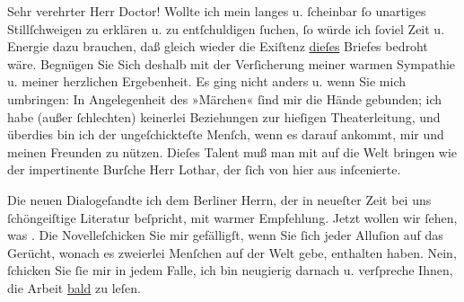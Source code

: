 \pstart{}Sehr verehrter Herr Doctor!\pend\vspace{0.5em}
\pstart
           Wollte ich mein langes u. ſcheinbar ſo unartiges Stillſchweigen zu erklären u. zu
          entſchuldigen ſuchen, ſo würde ich ſoviel Zeit u. Energie dazu brauchen, daß gleich wieder
          die Exiſtenz \uline{dieſes} Briefes bedroht wäre. Begnügen Sie
          Sich deshalb mit der Verſicherung meiner warmen Sympathie u. meiner herzlichen
          Ergebenheit. Es ging nicht anders u. wenn Sie mich umbringen: In Angelegenheit des »Märchen« ſind mir die Hände gebunden; ich habe (außer
          ſchlechten) keinerlei Beziehungen zur hieſigen Theaterleitung, und überdies bin ich der
          ungeſchickteſte Menſch, wenn es darauf ankommt, mir und meinen Freunden zu nützen. Dieſes
          Talent muß man mit auf die Welt bringen wie der impertinente Burſche Herr Lothar, der ſich \label{K_L00135-1v}\label{K_L00135-1} von hier aus
          inſcenierte.\pend
           
\pstart
           Die neuen Dialogeſandte ich dem Berliner Herrn, der in neueſter Zeit bei uns
          ſchöngeiſtige Literatur beſpricht, mit warmer Empfehlung. Jetzt wollen wir ſehen, was
            \label{K_L00135-2v}\label{K_L00135-2}. Die Novelleſchicken Sie mir gefälligſt, wenn Sie ſich jeder
          Alluſion {\pb}auf das Gerücht, wonach es zweierlei
          Menſchen auf der Welt gebe, enthalten haben. Nein, ſchicken Sie ſie mir in jedem Falle,
          ich bin neugierig darnach u. verſpreche Ihnen, die Arbeit \uline{bald} zu leſen.\pend
           
